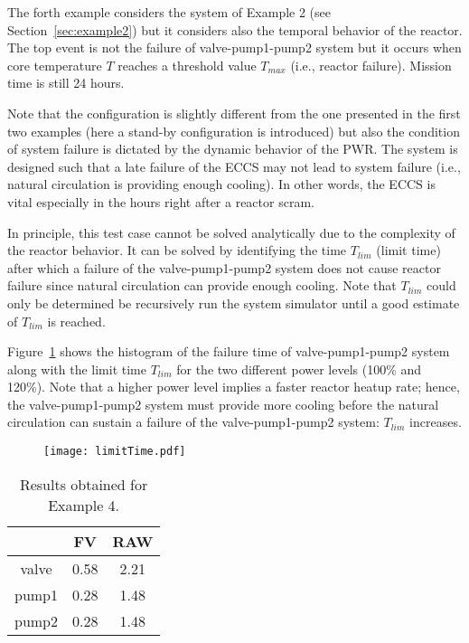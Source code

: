 The forth example considers the system of Example 2 (see Section~\ref{sec:example2}) but it considers 
also the temporal behavior of the reactor.
The top event is not the failure of valve-pump1-pump2 system but it occurs when core temperature $T$
reaches a threshold value $T_{max}$ (i.e., reactor failure). 
Mission time is still 24 hours.

Note that the configuration is slightly different from the one presented in the first two 
examples (here a stand-by configuration is introduced) but also the condition of system failure 
is dictated by the dynamic behavior of the PWR. The system is designed such that a late failure 
of the ECCS may not lead to system failure (i.e., natural circulation is providing enough cooling). 
In other words, the ECCS is vital especially in the hours right after a reactor scram.

In principle, this test case cannot be solved analytically due to the complexity of the reactor 
behavior. It can be solved by identifying the time $T_{lim}$ (limit time) after which a 
failure of the valve-pump1-pump2 system does not cause reactor failure since natural circulation
can provide enough cooling.
Note that $T_{lim}$ could only be determined be recursively run the system simulator until a 
good estimate of $T_{lim}$ is reached.

Figure~\ref{fig:limitTime} shows the histogram of the failure time of valve-pump1-pump2 system along 
with the limit time $T_{lim}$ for the two different power levels (100\% and 120\%). 
Note that a higher power level implies a faster reactor heatup rate; hence, the 
valve-pump1-pump2 system must provide more cooling before the natural circulation can sustain a failure
of the valve-pump1-pump2 system: $T_{lim}$ increases.

\begin{figure}
    \centering
    \centerline{\texttt{[image: limitTime.pdf]}}
    \caption{}
    \label{fig:limitTime}
\end{figure}

\begin{table}
  \caption{Results obtained for Example 4.}
  \centering
  \begin{tabular}{c | c | c }
    \hline
          & FV & RAW \\
    \hline
    valve & 0.58 & 2.21  \\
    pump1 & 0.28 & 1.48  \\
    pump2 & 0.28 & 1.48  \\
    \hline
  \end{tabular}
  \label{tab:example4}
\end{table}

